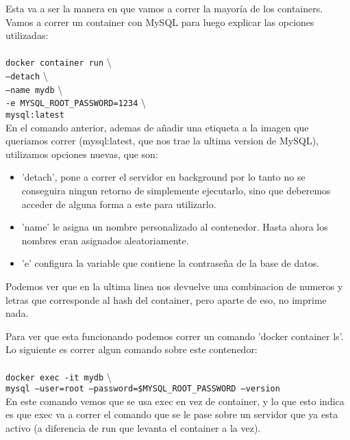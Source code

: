 \documentclass[11pt]{article} %
\begin{document}
Esta va a ser la manera en que vamos a correr la mayoría de los containers.\\
Vamos a correr un container con MySQL para luego explicar las opciones utilizadas:\\ \\
		\texttt{docker container run} \textbackslash \\
		\texttt{--detach} \textbackslash \\
		\texttt{--name mydb} \textbackslash \\
		\texttt{-e MYSQL\_ROOT\_PASSWORD=1234} \textbackslash \\
		\texttt{mysql:latest}
	\\

En el comando anterior, ademas de añadir una etiqueta a la imagen que queriamos correr (mysql:latest, que nos trae la ultima version de MySQL), utilizamos opciones nuevas, que son:
\begin{itemize}
	\item 	
 	'detach', pone a correr el servidor en background por lo tanto no se conseguira ningun retorno de simplemente ejecutarlo, sino que deberemos acceder de alguna forma a este para utilizarlo.
 	
 	\item
	'name' le asigna un nombre personalizado al contenedor. Hasta ahora los nombres eran asignados aleatoriamente.
	
	\item
	'e' configura la variable que contiene la contraseña de la base de datos.

\end{itemize}

Podemos ver que en la ultima linea nos devuelve una combinacion de numeros y letras que corresponde al hash del container, pero aparte de eso, no imprime nada.

Para ver que esta funcionando podemos correr un comando 'docker container ls'. Lo siguiente es correr algun comando sobre este contenedor:\\ \\
	\texttt{docker exec -it mydb} \textbackslash \\
	\texttt{mysql --user=root --password=\$MYSQL\_ROOT\_PASSWORD --version}\\

En este comando vemos que se usa exec en vez de container, y lo que esto indica es que exec va a correr el comando que se le pase sobre un servidor que ya esta activo (a diferencia de run que levanta el container a la vez). 
\end{document}
